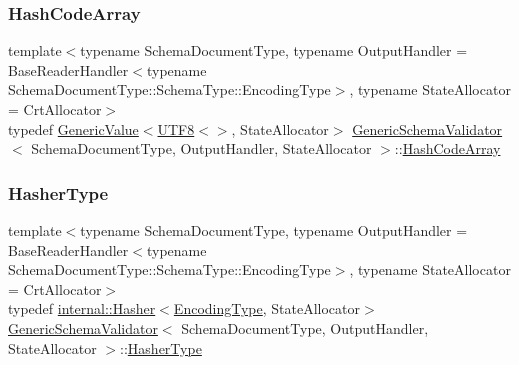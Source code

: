 \mbox{\label{classGenericSchemaValidator_ae1cb713f267c2df2f8c5d4fbfe427ea4}} 
\subsubsection{\texorpdfstring{Hash\+Code\+Array}{HashCodeArray}}
{\footnotesize\ttfamily template$<$typename Schema\+Document\+Type, typename Output\+Handler = Base\+Reader\+Handler$<$typename Schema\+Document\+Type\+::\+Schema\+Type\+::\+Encoding\+Type$>$, typename State\+Allocator = Crt\+Allocator$>$ \\
typedef \hyperlink{classGenericValue}{Generic\+Value}$<$\hyperlink{structUTF8}{U\+T\+F8}$<$$>$, State\+Allocator$>$ \hyperlink{classGenericSchemaValidator}{Generic\+Schema\+Validator}$<$ Schema\+Document\+Type, Output\+Handler, State\+Allocator $>$\+::\hyperlink{classGenericSchemaValidator_ae1cb713f267c2df2f8c5d4fbfe427ea4}{Hash\+Code\+Array}\hspace{0.3cm}{\ttfamily [private]}}

\mbox{\label{classGenericSchemaValidator_ab7df29495a3ba8f3f5dc828f90a40936}} 
\subsubsection{\texorpdfstring{Hasher\+Type}{HasherType}}
{\footnotesize\ttfamily template$<$typename Schema\+Document\+Type, typename Output\+Handler = Base\+Reader\+Handler$<$typename Schema\+Document\+Type\+::\+Schema\+Type\+::\+Encoding\+Type$>$, typename State\+Allocator = Crt\+Allocator$>$ \\
typedef \hyperlink{classinternal_1_1Hasher}{internal\+::\+Hasher}$<$\hyperlink{classGenericSchemaValidator_acf1c5361bb96da87d23167d8720b1ea5}{Encoding\+Type}, State\+Allocator$>$ \hyperlink{classGenericSchemaValidator}{Generic\+Schema\+Validator}$<$ Schema\+Document\+Type, Output\+Handler, State\+Allocator $>$\+::\hyperlink{classGenericSchemaValidator_ab7df29495a3ba8f3f5dc828f90a40936}{Hasher\+Type}\hspace{0.3cm}{\ttfamily [private]}}

